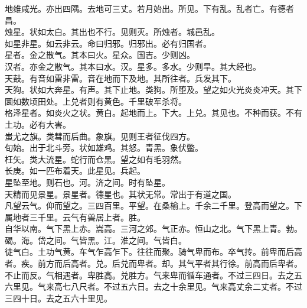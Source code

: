 \documentclass{zhvt-classic}
\begin{document}
\hspace*{2em}地维咸光。亦出四隅。去地可三丈。若月始出。所见。下有乱。乱者亡。有德者昌。\\
\hspace*{2em}烛星。状如太白。其出也不行。见则灭。所烛者。城邑乱。\\
\hspace*{2em}如星非星。如云非云。命曰归邪。归邪出。必有归国者。\\
\hspace*{2em}星者。金之散气。其本曰火。星众。国吉。少则凶。\\
\hspace*{2em}汉者。亦金之散气。其本曰水。汉。星多。多水。少则旱。其大经也。\\
\hspace*{2em}天鼓。有音如雷非雷。音在地而下及地。其所往者。兵发其下。\\
\hspace*{2em}天狗。状如大奔星。有声。其下止地。类狗。所堕及。望之如火光炎炎冲天。其下圜如数顷田处。上兑者则有黄色。千里破军杀将。\\
\hspace*{2em}格泽星者。如炎火之状。黄白。起地而上。下大。上兑。其见也。不种而获。不有土功。必有大害。\\
\hspace*{2em}蚩尤之旗。类彗而后曲。象旗。见则王者征伐四方。\\
\hspace*{2em}旬始。出于北斗旁。状如雄鸡。其怒。青黑。象伏鳖。\\
\hspace*{2em}枉矢。类大流星。蛇行而仓黑。望之如有毛羽然。\\
\hspace*{2em}长庚。如一匹布着天。此星见。兵起。\\
\hspace*{2em}星坠至地。则石也。河。济之间。时有坠星。\\
\hspace*{2em}天精而见景星。景星者。德星也。其状无常。常出于有道之国。\\
\hspace*{2em}凡望云气。仰而望之。三四百里。平望。在桑榆上。千余二千里。登高而望之。下属地者三千里。云气有兽居上者。胜。\\
\hspace*{2em}自华以南。气下黑上赤。嵩高。三河之郊。气正赤。恒山之北。气下黑上青。勃。碣。海。岱之间。气皆黑。江。淮之间。气皆白。\\
\hspace*{2em}徒气白。土功气黄。车气乍高乍下。往往而聚。骑气卑而布。卒气抟。前卑而后高者。疾。前方而后高者。兑。后兑而卑者。却。其气平者其行徐。前高而后卑者。不止而反。气相遇者。卑胜高。兑胜方。气来卑而循车通者。不过三四日。去之五六里见。气来高七八尺者。不过五六日。去之十余里见。气来高丈余二丈者。不过三四十日。去之五六十里见。\\
\end{document}
